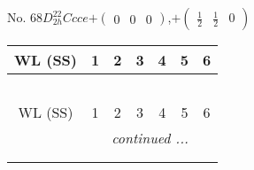 \documentclass[fleqn,9pt,landscape]{jsarticle}
\begin{document}
\newpage
No. 68\quad$D_{2h}^{22}$\quad$Ccce$\quad[ orthorhombic ]\quad$+\begin{pmatrix} 0 & 0 & 0 \end{pmatrix}$,\quad $+\begin{pmatrix} \frac{1}{2} & \frac{1}{2} & 0 \end{pmatrix}$
\begin{center}
\renewcommand{\arraystretch}{1.2}
\begin{longtable}{ccccccc}
 \hline \hline
WL (SS) & 1 & 2 & 3 & 4 & 5 & 6 \\ \hline \endfirsthead

\multicolumn{6}{l}{\tablename\ \thetable{}} \\
 \hline \hline
WL (SS) & 1 & 2 & 3 & 4 & 5 & 6 \\ \hline \endhead

 \hline \hline
\multicolumn{6}{r}{\footnotesize\it continued ...} \\ \endfoot

 \hline \hline
\multicolumn{6}{r}{} \\ \endlastfoot


\end{longtable}
\end{center}
\end{document}

